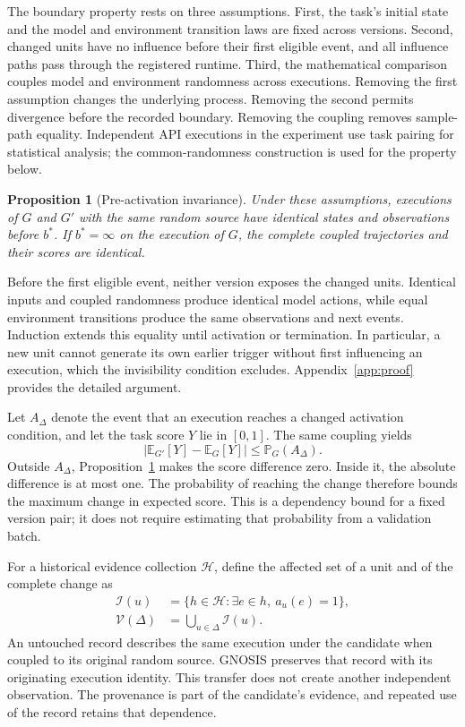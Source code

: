 \documentclass{ecai}
\newcommand{\E}{\mathbb{E}}
\newcommand{\Prob}{\mathbb{P}}
\newtheorem{proposition}{Proposition}
\begin{document}
The boundary property rests on three assumptions. First, the task's initial state and the model and environment transition laws are fixed across versions. Second, changed units have no influence before their first eligible event, and all influence paths pass through the registered runtime. Third, the mathematical comparison couples model and environment randomness across executions. Removing the first assumption changes the underlying process. Removing the second permits divergence before the recorded boundary. Removing the coupling removes sample-path equality. Independent API executions in the experiment use task pairing for statistical analysis; the common-randomness construction is used for the property below.

\begin{proposition}[Pre-activation invariance]
Under these assumptions, executions of $G$ and $G'$ with the same random source have identical states and observations before $b^*$. If $b^*=\infty$ on the execution of $G$, the complete coupled trajectories and their scores are identical.
\label{prop:invariance}
\end{proposition}

Before the first eligible event, neither version exposes the changed units. Identical inputs and coupled randomness produce identical model actions, while equal environment transitions produce the same observations and next events. Induction extends this equality until activation or termination. In particular, a new unit cannot generate its own earlier trigger without first influencing an execution, which the invisibility condition excludes. Appendix~\ref{app:proof} provides the detailed argument.

Let $A_\Delta$ denote the event that an execution reaches a changed activation condition, and let the task score $Y$ lie in $[0,1]$. The same coupling yields
\begin{equation}
\left|\E_{G'}[Y]-\E_G[Y]\right|
\leq \Prob_G(A_\Delta).
\label{eq:bound}
\end{equation}
Outside $A_\Delta$, Proposition~\ref{prop:invariance} makes the score difference zero. Inside it, the absolute difference is at most one. The probability of reaching the change therefore bounds the maximum change in expected score. This is a dependency bound for a fixed version pair; it does not require estimating that probability from a validation batch.

For a historical evidence collection $\mathcal H$, define the affected set of a unit and of the complete change as
\begin{align}
\mathcal I(u)&=\{h\in\mathcal H:\exists e\in h,\ a_u(e)=1\},\\
\mathcal V(\Delta)&=\bigcup_{u\in\Delta}\mathcal I(u).
\label{eq:union}
\end{align}
An untouched record describes the same execution under the candidate when coupled to its original random source. GNOSIS preserves that record with its originating execution identity. This transfer does not create another independent observation. The provenance is part of the candidate's evidence, and repeated use of the record retains that dependence.
\end{document}
